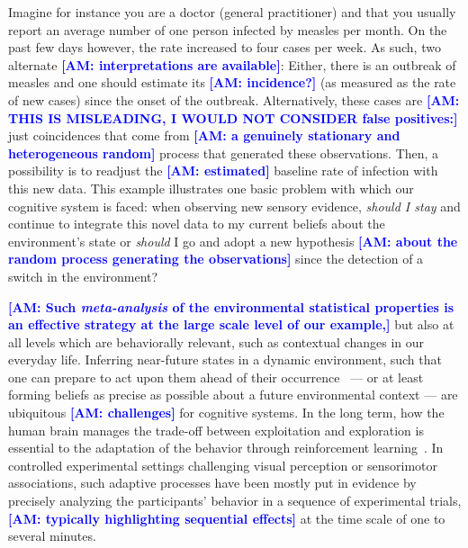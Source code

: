 \documentclass[12pt,english]{article}%
\newcommand{\citep}[1]{\parencite{#1}}
\newcommand{\AM}[1]{\textbf{\textcolor{blue}{[AM: #1]}}}
\begin{document}
Imagine for instance you are a doctor (general practitioner) and 
that you usually report an average number of 
one person infected by measles per month.
On the past few days however,
the rate increased to four cases per week.
As such, two alternate \AM{interpretations are available}:
Either, there is an outbreak of measles and 
one should estimate its \AM{incidence?} 
(as measured as the rate of new cases)
since the onset of the outbreak.
Alternatively, these cases are \AM{THIS IS MISLEADING, I WOULD NOT CONSIDER false positives:}
just coincidences that come from
\AM{a genuinely stationary and heterogeneous random} process 
that generated these observations.
Then, a possibility is to readjust the \AM{estimated} baseline rate of infection
with this new data.
This example illustrates one basic problem with which our cognitive system is faced:
when observing new sensory evidence, 
\emph{should I stay} and continue to integrate this novel data 
to my current beliefs about the environment's state
or \emph{should} I go and adopt a new hypothesis \AM{about the random process generating the observations}
since the detection of a switch in the environment?

\AM{Such \emph{meta-analysis} of the environmental statistical properties is an effective strategy at the large scale level of our example,}
but also at all levels which are behaviorally relevant,
such as contextual changes in our everyday life.
Inferring near-future states in a dynamic environment, such that one can prepare to act upon them ahead of their occurrence~\citep{PerrinetAdamasFriston2014} ---
or at least forming beliefs as precise as possible
about a future environmental context ---
are ubiquitous \AM{challenges} for cognitive systems.
In the long term, how the human brain manages 
the trade-off between exploitation and exploration
is essential to the adaptation
of the behavior through reinforcement learning~\citep{Cohen2007}.
In controlled experimental settings challenging visual perception or sensorimotor associations,
such adaptive processes have been mostly put in evidence
by precisely analyzing the participants' behavior in a sequence of experimental trials,
\AM{typically highlighting sequential effects}
at the time scale of one to several minutes.
\end{document}
